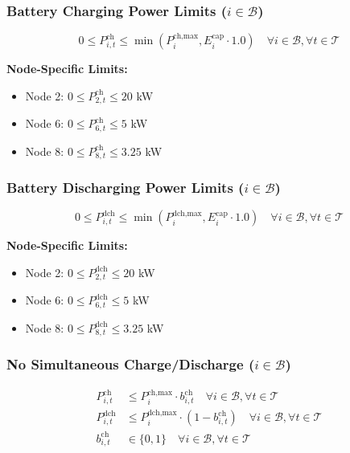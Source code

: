 \documentclass[11pt,a4paper]{article}
\begin{document}
\subsubsection{Battery Charging Power Limits ($i \in \mathcal{B}$)}

\begin{equation}
0 \leq P_{i,t}^{\text{ch}} \leq \min(P_i^{\text{ch,max}}, E_i^{\text{cap}} \cdot 1.0) \quad \forall i \in \mathcal{B}, \forall t \in \mathcal{T}
\end{equation}

\textbf{Node-Specific Limits:}
\begin{itemize}
    \item Node 2: $0 \leq P_{2,t}^{\text{ch}} \leq 20$ kW
    \item Node 6: $0 \leq P_{6,t}^{\text{ch}} \leq 5$ kW
    \item Node 8: $0 \leq P_{8,t}^{\text{ch}} \leq 3.25$ kW
\end{itemize}

\subsubsection{Battery Discharging Power Limits ($i \in \mathcal{B}$)}

\begin{equation}
0 \leq P_{i,t}^{\text{dch}} \leq \min(P_i^{\text{dch,max}}, E_i^{\text{cap}} \cdot 1.0) \quad \forall i \in \mathcal{B}, \forall t \in \mathcal{T}
\end{equation}

\textbf{Node-Specific Limits:}
\begin{itemize}
    \item Node 2: $0 \leq P_{2,t}^{\text{dch}} \leq 20$ kW
    \item Node 6: $0 \leq P_{6,t}^{\text{dch}} \leq 5$ kW
    \item Node 8: $0 \leq P_{8,t}^{\text{dch}} \leq 3.25$ kW
\end{itemize}

\subsubsection{No Simultaneous Charge/Discharge ($i \in \mathcal{B}$)}

\begin{align}
P_{i,t}^{\text{ch}} &\leq P_i^{\text{ch,max}} \cdot b_{i,t}^{\text{ch}} \quad \forall i \in \mathcal{B}, \forall t \in \mathcal{T} \\
P_{i,t}^{\text{dch}} &\leq P_i^{\text{dch,max}} \cdot (1 - b_{i,t}^{\text{ch}}) \quad \forall i \in \mathcal{B}, \forall t \in \mathcal{T} \\
b_{i,t}^{\text{ch}} &\in \{0, 1\} \quad \forall i \in \mathcal{B}, \forall t \in \mathcal{T}
\end{align}
\end{document}
